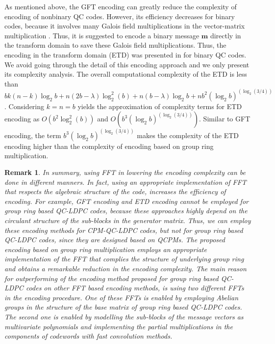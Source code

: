 \documentclass[journal,draftclsnofoot,onecolumn,12pt,twoside]{IEEEtran}
\newtheorem{rem}{Remark}[section]
\begin{document}
\textcolor{mycolor}{As mentioned  above, the GFT encoding can greatly reduce the complexity of encoding of nonbinary QC codes.
However, its efficiency decreases for binary codes, because it involves many Galois field multiplications in the vector-matrix multiplication \cite{FFT_encoding}.  Thus, it is suggested to encode a binary message
$\mathbf{m}$ directly in the transform domain to save these Galois field multiplications. Thus, the encoding in the transform domain (ETD) was presented in \cite{FFT_encoding} for binary QC codes. We avoid going through the detail of this encoding approach and we only present its complexity analysis. The overall computational
complexity of the ETD is less than $bk(n-k)\log_2 b+n(2b-\lambda)\log_2^2(b)+n(b-\lambda)\log_2 b+nb^2(\log_2 b)^{(\log_2(3/4))}$. Considering $k=n=b$ yields the approximation of complexity terms for ETD encoding  as $O(b^2\log_2^2(b))$ and $O(b^3(\log_2 b)^{(\log_2(3/4))})$. Similar to GFT encoding, the term $b^3(\log_2 b)^{(\log_2(3/4))}$ makes the complexity of the ETD encoding higher than the complexity of encoding based on group ring multiplication.}
\textcolor{mycolor}{\begin{rem}
In summary, using FFT in lowering the encoding complexity can be done in different manners. In fact, using an appropriate implementation of FFT that respects the algebraic structure of the code, increases the efficiency of encoding. For example,  GFT encoding and  ETD encoding cannot be employed for group ring based QC-LDPC codes, because these approaches
highly depend on the circulant structure of the sub-blocks in the generator matrix. Thus, we can employ these encoding methods for CPM-QC-LDPC codes, but not for group ring based QC-LDPC codes, since they are designed based on QCPMs. The proposed encoding based on  group ring multiplication employs an appropriate implementation of the FFT that complies the structure of underlying group ring and obtains a remarkable reduction in the encoding complexity. The main reason for outperforming of the encoding method proposed  for group ring based QC-LDPC codes on other FFT based encoding methods, is using  two different FFTs in the encoding procedure. One of these FFTs is enabled by employing Abelian groups in the structure of the base matrix of group ring based QC-LDPC codes. The second one is enabled by modelling the sub-blocks of the message vectors as multivariate polynomials and implementing the partial multiplications in the components of codewords with fast convolution methods.
\end{rem}}
\end{document}
